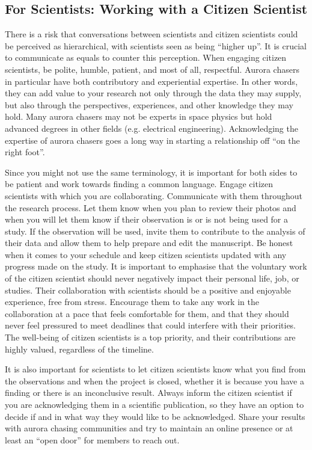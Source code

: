 \documentclass{article}
\newcommand{\contributed}[1]{%
    \par\noindent
    \begingroup
    \setlength{\leftskip}{1em}%
    \itshape
    Contributors: #1
    \par
    \endgroup
    \vspace{0.5em}
}
\begin{document}
\subsection{For Scientists: Working with a Citizen Scientist} 
There is a risk that conversations between scientists and citizen scientists could be perceived as hierarchical, with scientists seen as being ``higher up''. It is crucial to communicate as equals to counter this perception. When engaging citizen scientists, be polite, humble, patient, and most of all, respectful. Aurora chasers in particular have both contributory and experiential expertise. In other words, they can add value to your research not only through the data they may supply, but also through the perspectives, experiences, and other knowledge they may hold. Many aurora chasers may not be experts in space physics but hold advanced degrees in other fields (e.g. electrical engineering). Acknowledging the expertise of aurora chasers goes a long way in starting a relationship off  ``on the right foot''.

Since you might not use the same terminology, it is important for both sides to be patient and work towards finding a common language. Engage citizen scientists with which you are collaborating. Communicate with them throughout the research process. Let them know when you plan to review their photos and when you will let them know if their observation is or is not being used for a study. If the observation will be used, invite them to contribute to the analysis of their data and allow them to help prepare and edit the manuscript. Be honest when it comes to your schedule and keep citizen scientists updated with any progress made on the study. It is important to emphasise that the voluntary work of the citizen scientist should never negatively impact their personal life, job, or studies. Their collaboration with scientists should be a positive and enjoyable experience, free from stress. Encourage them to take any work in the collaboration at a pace that feels comfortable for them, and that they should never feel pressured to meet deadlines that could interfere with their priorities. The well-being of citizen scientists is a top priority, and their contributions are highly valued, regardless of the timeline.

It is also important for scientists to let citizen scientists know what you find from the observations and when the project is closed, whether it is because you have a finding or there is an inconclusive result. Always inform the citizen scientist if you are acknowledging them in a scientific publication, so they have an option to decide if and in what way they would like to be acknowledged. Share your results with aurora chasing communities and try to maintain an online presence or at least an ``open door'' for members to reach out.
\end{document}
